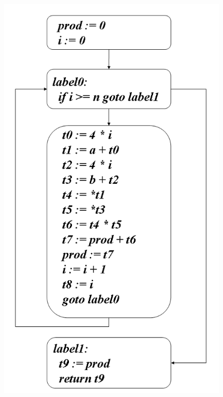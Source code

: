 \begin{figure}[htbp]
\begin{center}
\begin{htmlonly}
\includegraphics[width=0.8\linewidth,height=1.436\linewidth]{basic_block.png}
\end{htmlonly}
\begin{latexonly}

\end{latexonly}
\end{center}
\end{figure}
